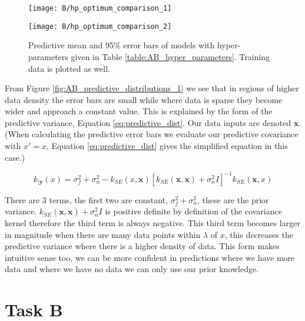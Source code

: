 \documentclass[11pt]{article}
\begin{document}
\begin{figure}[h]
    \centering
    \begin{minipage}{0.45\textwidth}
        \centering
        \texttt{[image: B/hp\_optimum\_comparison\_1]} 
        \label{fig:AB_predictive_distributions_1}
    \end{minipage}%
    \begin{minipage}{0.45\textwidth}
        \centering
        \texttt{[image: B/hp\_optimum\_comparison\_2]} 
        \label{fig:AB_predictive_distributions_2}
    \end{minipage}
    \caption{Predictive mean and 95\% error bars of models with hyper-parameters given in Table \ref{table:AB_hyper_parameters}. Training data is plotted as well.}
    \label{fig:AB_predictive_distributions}
\end{figure}

From Figure \ref{fig:AB_predictive_distributions_1} we see that in regions of higher data density the error bars are small while where data is sparse they become wider and approach a constant value. This is explained by the form of the predictive variance, Equation \ref{eq:predictive_dist}. Our data inputs are denoted $\textbf{x}$. (When calculating the predictive error bars we evaluate our predictive covariance with $x' = x$, Equation \ref{eq:predictive_dist} gives the simplified equation in this case.)

\begin{equation}
    k_{|\textbf{y}}(x) = \sigma_f^2 + \sigma_n^2 - k_{SE}(x, \textbf{x})[k_{SE}(\textbf{x}, \textbf{x}) + \sigma_n^2 I]^{-1} k_{SE}(\textbf{x}, x)
    \label{eq:predictive_dist}
\end{equation}

There are 3 terms, the first two are constant, $\sigma_f^2 + \sigma_n^2$, these are the prior variance. $k_{SE}(\textbf{x}, \textbf{x}) + \sigma_n^2 I$ is positive definite by definition of the covariance kernel therefore the third term is always negative. This third term becomes larger in magnitude when there are many data points within $\lambda$ of $x$, this decreases the predictive variance where there is a higher density of data. This form makes intuitive sense too, we can be more confident in predictions where we have more data and where we have no data we can only use our prior knowledge.

\section{Task B}
\end{document}
